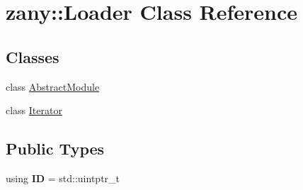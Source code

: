 \hypertarget{classzany_1_1_loader}{}\section{zany\+:\+:Loader Class Reference}
\label{classzany_1_1_loader}
\subsection*{Classes}
\begin{DoxyCompactItemize}
\item 
class \hyperlink{classzany_1_1_loader_1_1_abstract_module}{Abstract\+Module}
\item 
class \hyperlink{classzany_1_1_loader_1_1_iterator}{Iterator}
\end{DoxyCompactItemize}
\subsection*{Public Types}
\begin{DoxyCompactItemize}
\item 
\mbox{\label{classzany_1_1_loader_a9138e03a480e97fa49810e3735b1e114}} 
using {\bfseries ID} = std\+::uintptr\+\_\+t
\end{DoxyCompactItemize}
